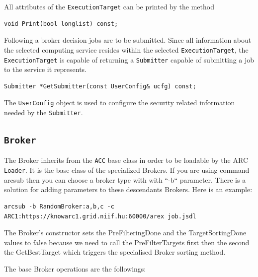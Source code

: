 \documentclass{book}
\newcommand{\ACC}{\texttt{ACC}}
\newcommand{\Broker}{\texttt{Broker}}
\newcommand{\ExecutionTarget}{\texttt{ExecutionTarget}}
\newcommand{\Submitter}{\texttt{Submitter}}
\newcommand{\UserConfig}{\texttt{UserConfig}}
\begin{document}
All attributes of the {\ExecutionTarget} can be printed by the method

\begin{shaded}
\begin{verbatim}
void Print(bool longlist) const;
\end{verbatim}
\end{shaded}

Following a broker decision jobs are to be submitted. Since all
information about the selected computing service resides within the
selected {\ExecutionTarget}, the {\ExecutionTarget} is capable of
returning a {\Submitter} capable of submitting a job to the service it
represents.

\begin{shaded}
\begin{verbatim}
Submitter *GetSubmitter(const UserConfig& ucfg) const;
\end{verbatim}
\end{shaded}

The {\UserConfig} object is used to configure the security related
information needed by the {\Submitter}.

\subsection{{\Broker}}

The Broker inherits from the {\ACC} base class in order to be loadable by the ARC \texttt{Loader}. It is the base class of the specialized Brokers. If you are using command arcsub then you can choose a broker type with with ``-b`` parameter. There is a solution for adding parameters to these descendants Brokers. Here is an example:

\begin{shaded}
\begin{verbatim}
arcsub -b RandomBroker:a,b,c -c ARC1:https://knowarc1.grid.niif.hu:60000/arex job.jsdl
\end{verbatim}
\end{shaded}

The Broker's constructor sets the PreFilteringDone and the TargetSortingDone values to false because we need to call the PreFilterTargets first then the second the GetBestTarget which triggers the specialised Broker sorting method.

The base Broker operations are the followings:
\end{document}
